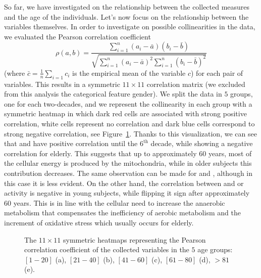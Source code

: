 So far, we have investigated on the relationship between the collected measures and the age of the individuals. Let's now focus on the relationship between the variables themselves. In order to investigate on possible collinearities in the data, we evaluated the Pearson correlation coefficient
$$
	\rho(a, b) = \frac{\sum_{i=1}^n (a_i - \bar a)(b_i - \bar b)}{\sqrt{\sum_{i=1}^n(a_i-\bar a)^2 \sum_{i=1}^n(b_i-\bar b)^2}}
$$
(where $\bar c = \frac{1}{n}\sum_{i=1} c_i$ is the empirical mean of the variable $c$) for each pair of variables. This results in a symmetric $11 \times 11$ correlation matrix (we excluded from this analysis the categorical feature gender).
We split the data in $5$ groups, one for each two-decades, and we represent the collinearity in each group with a symmetric heatmap in which dark red cells are associated with strong positive correlation, white cells represent no correlation and dark blue cells correspond to strong negative correlation, see Figure~\ref{fig:heatmaps}.
Thanks to this visualization, we can see that \atpamp and \popyrmal have positive correlation until the $6^{\text{th}}$ decade, while showing a negative correlation for elderly.
This suggests that up to approximately $60$ years, most of the cellular energy is produced by the mitochondria, while in older subjects this contribution decreases. The same observation can be made for \atpamp and \posucc, although in this case it is less evident. On the other hand, the correlation between \atpamp and \mda or \ldh activity is negative in young subjects, while flipping it sign after approximately $60$ years.
This is in line with the cellular need to increase the anaerobic metabolism that compensates the inefficiency of aerobic metabolism and the increment of oxidative stress which usually occurs for elderly.

\begin{figure}[]
	\centering
		\hfill%
   \hfill
	\caption{The $11 \times 11$ symmetric heatmaps representing the Pearson correlation coefficient of the collected variables in the $5$ age groups: $[1-20]$ (a), $[21-40]$ (b), $[41-60]$ (c), $[61-80]$ (d), $>81$ (e).} \label{fig:heatmaps}
\end{figure}


